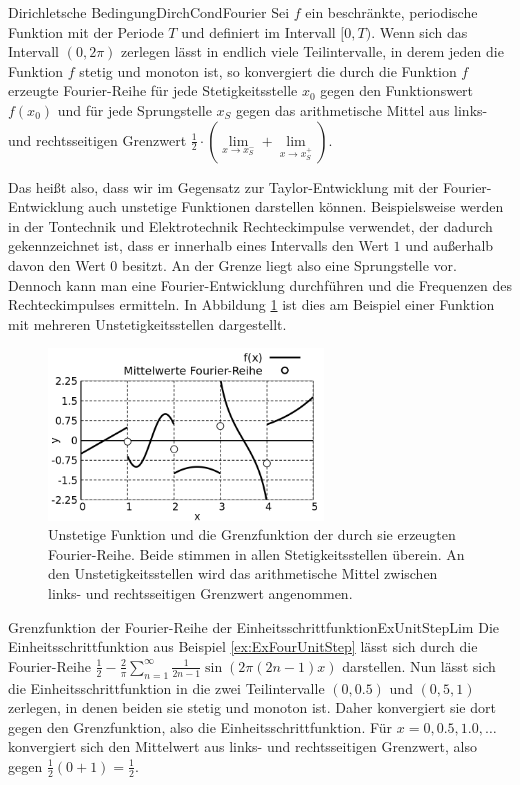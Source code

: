 \begin{statement}{Dirichletsche Bedingung}{DirchCondFourier}
    Sei $f$ ein beschränkte, periodische Funktion mit der Periode $T$ und definiert im Intervall $[0,T)$. Wenn sich das Intervall $(0,2\pi)$ zerlegen lässt in endlich viele Teilintervalle, in derem jeden die Funktion $f$ stetig und monoton ist, so konvergiert die durch die Funktion $f$ erzeugte Fourier-Reihe für jede Stetigkeitsstelle $x_0$ gegen den Funktionswert $f(x_0)$ und für jede Sprungstelle $x_S$ gegen das arithmetische Mittel aus links- und rechtsseitigen Grenzwert $\frac{1}{2} \cdot \left(\lim\limits_{x\to x_S^-} + \lim\limits_{x\to x_S^+}\right)$.
\end{statement}

Das heißt also, dass wir im Gegensatz zur Taylor-Entwicklung mit der Fourier-Entwicklung auch unstetige Funktionen darstellen können. Beispielsweise werden in der Tontechnik und Elektrotechnik Rechteckimpulse verwendet, der dadurch gekennzeichnet ist, dass er innerhalb eines Intervalls den Wert $1$ und außerhalb davon den Wert $0$ besitzt. An der Grenze liegt also eine Sprungstelle vor. Dennoch kann man eine Fourier-Entwicklung durchführen und die Frequenzen des Rechteckimpulses ermitteln. In Abbildung \ref{fig:ExFourierDirichlet} ist dies am Beispiel einer Funktion mit mehreren Unstetigkeitsstellen dargestellt.

\begin{figure}
    \centering
    \includegraphics[width=0.65\textwidth]{./gnuplot/fourier-dirichlet}
    \caption[Fourier-Reihe einer unstetigen Funktion]{Unstetige Funktion und die Grenzfunktion der durch sie erzeugten Fourier-Reihe. Beide stimmen in allen Stetigkeitsstellen überein. An den Unstetigkeitsstellen wird das arithmetische Mittel zwischen links- und rechtsseitigen Grenzwert angenommen.}
    \label{fig:ExFourierDirichlet}
\end{figure}

\begin{example}{Grenzfunktion der Fourier-Reihe der Einheitsschrittfunktion}{ExUnitStepLim}
    Die Einheitsschrittfunktion aus Beispiel \ref{ex:ExFourUnitStep} lässt sich durch die Fourier-Reihe $\frac{1}{2} - \frac{2}{\pi} \sum\limits_{n=1}^\infty \frac{1}{2n-1} \sin(2\pi (2n-1) x)$ darstellen. Nun lässt sich die Einheitsschrittfunktion in die zwei Teilintervalle $(0, 0.5)$ und $(0,5, 1)$ zerlegen, in denen beiden sie stetig und monoton ist. Daher konvergiert sie dort gegen den Grenzfunktion, also die Einheitsschrittfunktion. Für $x=0,0.5,1.0,\dots$ konvergiert sich den Mittelwert aus links- und rechtsseitigen Grenzwert, also gegen $\frac{1}{2} (0+1) = \frac{1}{2}$.
\end{example}

